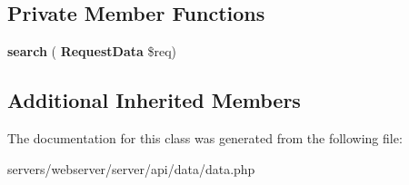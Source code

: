\subsection*{Private Member Functions}
\begin{DoxyCompactItemize}
\item 
\mbox{\label{class_lora_1_1_api_1_1_action___data_adea63eb9d6f49832427cbb855c4c59ce}} 
{\bfseries search} (\textbf{ Request\+Data} \$req)
\end{DoxyCompactItemize}
\subsection*{Additional Inherited Members}


The documentation for this class was generated from the following file\+:\begin{DoxyCompactItemize}
\item 
servers/webserver/server/api/data/data.\+php\end{DoxyCompactItemize}
